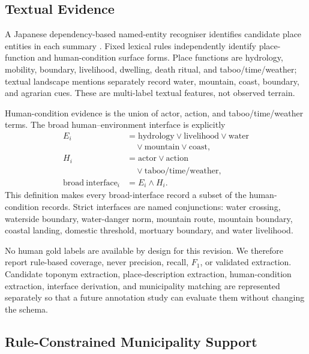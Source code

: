 \documentclass[9pt,twocolumn,a4paper]{extarticle}
\begin{document}
\subsection{Textual Evidence}

A Japanese dependency-based named-entity recogniser identifies candidate place entities in each summary \citep{matsuda2020}. Fixed lexical rules independently identify place-function and human-condition surface forms. Place functions are hydrology, mobility, boundary, livelihood, dwelling, death ritual, and taboo/time/weather; textual landscape mentions separately record water, mountain, coast, boundary, and agrarian cues. These are multi-label textual features, not observed terrain.

Human-condition evidence is the union of actor, action, and taboo/time/weather terms. The broad human--environment interface is explicitly
\begin{equation}
\begin{aligned}
E_i &= \mathrm{hydrology}\lor\mathrm{livelihood}\lor\mathrm{water}\\
    &\quad\lor\mathrm{mountain}\lor\mathrm{coast},\\
H_i &= \mathrm{actor}\lor\mathrm{action}\\
    &\quad\lor\mathrm{taboo/time/weather},\\
\mathrm{broad\ interface}_i &= E_i\land H_i .
\end{aligned}
\label{eq:interface}
\end{equation}
This definition makes every broad-interface record a subset of the human-condition records. Strict interfaces are named conjunctions: water crossing, waterside boundary, water-danger norm, mountain route, mountain boundary, coastal landing, domestic threshold, mortuary boundary, and water livelihood.

No human gold labels are available by design for this revision. We therefore report rule-based coverage, never precision, recall, \(F_1\), or validated extraction. Candidate toponym extraction, place-description extraction, human-condition extraction, interface derivation, and municipality matching are represented separately so that a future annotation study can evaluate them without changing the schema.

\subsection{Rule-Constrained Municipality Support}
\end{document}
